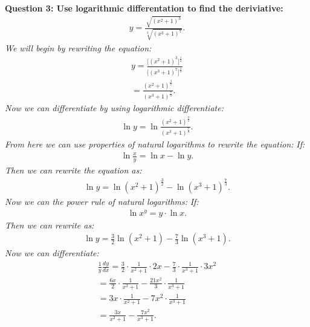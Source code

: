 \documentclass{report}
\begin{document}
    \pagebreak \bigbreak \noindent
    \begin{mdframed}
        \textbf{Question 3: Use logarithmic differentation to find the deriviative:}
        \begin{align*}
            y = \frac{\sqrt{(x^{2}+1)^{3}}}{\sqrt[3]{(x^{3}+1)^{7}}}
        .\end{align*}
        \bigbreak \noindent 
        \textit{We will begin by rewriting the equation:}
        \begin{align*}
            y = \frac{\big[(x^{2}+1)^{3}\big]^{\frac{1}{2}}}{\big[(x^{3}+1)^{7}\big]^{\frac{1}{3}}} \\
            = \frac{(x^{2}+1)^{\frac{3}{2}}}{(x^{3}+1)^{\frac{7}{3}}}
        .\end{align*}
        \bigbreak \noindent 
        \textit{Now we can differentiate by using logarithmic differentiate:}
        \begin{align*}
            \ln{y} = \ln{\frac{(x^{2}+1)^{\frac{3}{2}}}{(x^{3}+1)^{\frac{7}{3}}}}
        .\end{align*}
        \bigbreak \noindent 
        \textit{From here we can use properties of natural logarithms to rewrite the equation:}
        \bigbreak \noindent 
        \textit{If:}
        \begin{align*}
            \ln{\frac{x}{y}} = \ln{x} - \ln{y}
        .\end{align*}
        \bigbreak \noindent 
        \textit{Then we can rewrite the equation as:}
        \begin{align*}
            \ln{y} = \ln{(x^{2}+1)^{\frac{3}{2}}} - \ln{(x^{3}+1)^{\frac{7}{3}}}
        .\end{align*}
        \bigbreak \noindent 
        \textit{Now we can the power rule of natural logarithms:}
        \bigbreak \noindent 
        \textit{If:}
        \begin{align*}
            \ln{x^{y}} = y \cdot \ln{x}
        .\end{align*}
        \bigbreak \noindent 
        \textit{Then we can rewrite as:}
        \begin{align*}
            \ln{y} = \frac{3}{2}\ln{(x^{2}+1)} - \frac{7}{3}\ln{(x^{3}+1)}
        .\end{align*}
        \textit{Now we can differentiate:}
        \begin{align*}
            \frac{1}{y}\frac{dy}{dx} = \frac{3}{2} \cdot \frac{1}{x^{2}+1} \cdot 2x - \frac{7}{3}\cdot \frac{1}{x^{3}+1} \cdot 3x^{2} \\
            = \frac{6x}{2}\cdot \frac{1}{x^{2}+1} - \frac{21x^{2}}{3}\cdot \frac{1}{x^{3}+1} \\
            = 3x \cdot \frac{1}{x^{2}+1} - 7x^{2}\cdot \frac{1}{x^{3}+1} \\
            = \frac{3x}{x^{2}+1} - \frac{7x^{2}}{x^{3}+1}
        .\end{align*}
    \end{mdframed}
\end{document}
